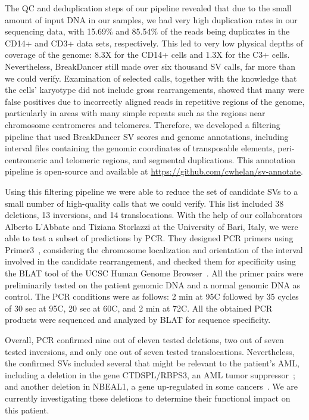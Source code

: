 The QC and deduplication steps of our pipeline revealed that due to the small amount of input DNA in our samples, we had very high duplication rates in our sequencing data, with 15.69\% and 85.54\% of the reads being duplicates in the CD14+ and CD3+ data sets, respectively. This led to very low physical depths of coverage of the genome: 8.3X for the CD14+ cells and 1.3X for the C3+ cells. Nevertheless, BreakDancer still made over six thousand SV calls, far more than we could verify. Examination of selected calls, together with the knowledge that the cells' karyotype did not include gross rearrangements, showed that many were false positives due to incorrectly aligned reads in repetitive regions of the genome, particularly in areas with many simple repeats such as the regions near chromosome centromeres and telomeres. Therefore, we developed a filtering pipeline that used BreakDancer SV scores and genome annotations, including interval files containing the genomic coordinates of transposable elements, peri-centromeric and telomeric regions, and segmental duplications. This annotation pipeline is open-source and available at \url{https://github.com/cwhelan/sv-annotate}. 

Using this filtering pipeline we were able to reduce the set of candidate SVs to a small number of high-quality calls that we could verify. This list included 38 deletions, 13 inversions, and 14 translocations. With the help of our collaborators Alberto L'Abbate and Tiziana Storlazzi at the University of Bari, Italy, we were able to test a subset of predictions by PCR. They designed PCR primers using Primer3~\cite{Untergasser01082012}, considering the chromosome localization and orientation of the interval involved in the candidate rearrangement, and checked them for specificity using the BLAT tool of the UCSC Human Genome Browser~\cite{Kent01042002}. All the primer pairs were preliminarily tested on the patient genomic DNA and a normal genomic DNA as control. The PCR conditions were as follows: 2 min at 95\degree C followed by 35 cycles of 30 sec at 95\degree C, 20 sec at 60\degree C, and 2 min at 72\degree C. All the obtained PCR products were sequenced and analyzed by BLAT for sequence specificity. 

Overall, PCR confirmed nine out of eleven tested deletions, two out of seven tested inversions, and only one out of seven tested translocations. Nevertheless, the confirmed SVs included several that might be relevant to the patient's AML, including a deletion in the gene CTDSPL/RBPS3, an AML tumor suppressor~\cite{Zheng:2012kk}; and another deletion in NBEAL1, a gene up-regulated in some cancers~\cite{Chen:2004jo}. We are currently investigating these deletions to determine their functional impact on this patient. 

